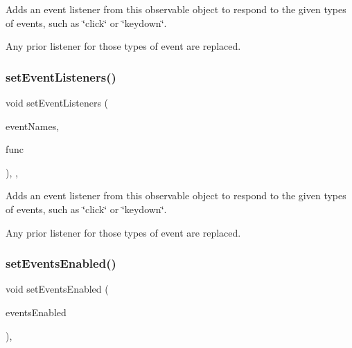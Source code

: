 Adds an event listener from this observable object to respond to the given types of events, such as \char`\"{}click\char`\"{} or \char`\"{}keydown\char`\"{}. 

Any prior listener for those types of event are replaced. \mbox{\label{classGObservable_a7867184bbb686f74fae8a4db927da799}} 
\subsubsection{\texorpdfstring{set\+Event\+Listeners()}{setEventListeners()}\hspace{0.1cm}{\footnotesize\ttfamily [2/2]}}
{\footnotesize\ttfamily void set\+Event\+Listeners (\begin{DoxyParamCaption}\item[{std\+::initializer\+\_\+list$<$ std\+::string $>$}]{event\+Names,  }\item[{G\+Event\+Listener\+Void}]{func }\end{DoxyParamCaption})\hspace{0.3cm}{\ttfamily [protected]}, {\ttfamily [virtual]}, {\ttfamily [inherited]}}



Adds an event listener from this observable object to respond to the given types of events, such as \char`\"{}click\char`\"{} or \char`\"{}keydown\char`\"{}. 

Any prior listener for those types of event are replaced. \mbox{\label{classGObservable_afaa30b2a9e0f378fd1c70d2f1d0b8216}} 
\subsubsection{\texorpdfstring{set\+Events\+Enabled()}{setEventsEnabled()}}
{\footnotesize\ttfamily void set\+Events\+Enabled (\begin{DoxyParamCaption}\item[{bool}]{events\+Enabled }\end{DoxyParamCaption})\hspace{0.3cm}{\ttfamily [virtual]}, {\ttfamily [inherited]}}



